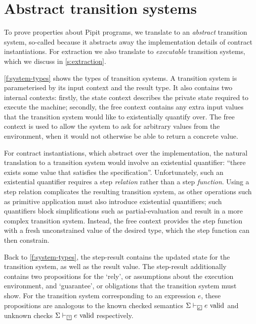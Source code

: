 
\section{Abstract transition systems}
\label{s:transition}


To prove properties about Pipit programs, we translate to an \emph{abstract} transition system, so-called because it abstracts away the implementation details of contract instantiations.
For extraction we also translate to \emph{executable} transition systems, which we discuss in \autoref{s:extraction}.

\autoref{f:system-types} shows the types of transition systems.
A transition system is parameterised by its input context and the result type.
It also contains two internal contexts: firstly, the state context describes the private state required to execute the machine; secondly, the free context contains any extra input values that the transition system would like to existentially quantify over.
The free context is used to allow the system to ask for arbitrary values from the environment, when it would not otherwise be able to return a concrete value.

For contract instantiations, which abstract over the implementation, the natural translation to a transition system would involve an existential quantifier: ``there exists some value that satisfies the specification''.
Unfortunately, such an existential quantifier requires a step \emph{relation} rather than a step \emph{function}.
Using a step relation complicates the resulting transition system, as other operations such as primitive application must also introduce existential quantifiers; such quantifiers block simplifications such as partial-evaluation and result in a more complex transition system.
Instead, the free context provides the step function with a fresh unconstrained value of the desired type, which the step function can then constrain.

Back to \autoref{f:system-types}, the step-result contains the updated state for the transition system, as well as the result value.
The step-result additionally contains two propositions for the `rely', or assumptions about the execution environment, and `guarantee', or obligations that the transition system must show.
For the transition system corresponding to an expression $e$, these propositions are analogous to the known checked semantics $\semcheck{\Sigma}{\PSValid}{e}$ and unknown checks $\semcheck{\Sigma}{\PSUnknown}{e}$ respectively.

